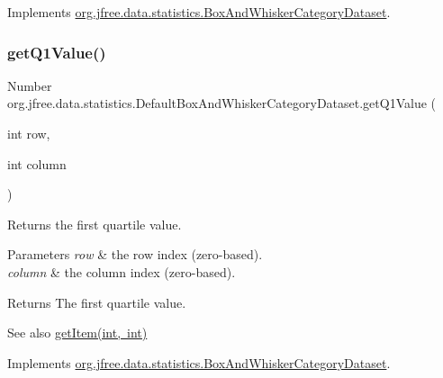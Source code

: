 Implements \mbox{\hyperlink{interfaceorg_1_1jfree_1_1data_1_1statistics_1_1_box_and_whisker_category_dataset_a42643c81a2ac6cf5643c87e01b2120c3}{org.\+jfree.\+data.\+statistics.\+Box\+And\+Whisker\+Category\+Dataset}}.

\mbox{\label{classorg_1_1jfree_1_1data_1_1statistics_1_1_default_box_and_whisker_category_dataset_a4b862aaed6798d006e261389b4a2c63b}} 
\subsubsection{\texorpdfstring{get\+Q1\+Value()}{getQ1Value()}\hspace{0.1cm}{\footnotesize\ttfamily [1/2]}}
{\footnotesize\ttfamily Number org.\+jfree.\+data.\+statistics.\+Default\+Box\+And\+Whisker\+Category\+Dataset.\+get\+Q1\+Value (\begin{DoxyParamCaption}\item[{int}]{row,  }\item[{int}]{column }\end{DoxyParamCaption})}

Returns the first quartile value.


\begin{DoxyParams}{Parameters}
{\em row} & the row index (zero-\/based). \\
\hline
{\em column} & the column index (zero-\/based).\\
\hline
\end{DoxyParams}
\begin{DoxyReturn}{Returns}
The first quartile value.
\end{DoxyReturn}
\begin{DoxySeeAlso}{See also}
\mbox{\hyperlink{classorg_1_1jfree_1_1data_1_1statistics_1_1_default_box_and_whisker_category_dataset_a85c944b06e4337059ea728b3a744e2a9}{get\+Item(int, int)}} 
\end{DoxySeeAlso}


Implements \mbox{\hyperlink{interfaceorg_1_1jfree_1_1data_1_1statistics_1_1_box_and_whisker_category_dataset_a174d2b0408011a2efda5b82af2fd2dd8}{org.\+jfree.\+data.\+statistics.\+Box\+And\+Whisker\+Category\+Dataset}}.

